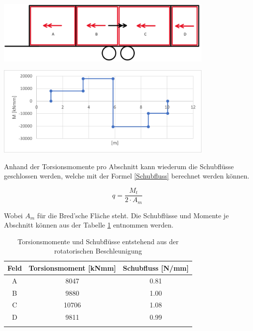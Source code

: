 \begin{center}
  \includegraphics[width=0.8\textwidth]{04_Figures/1.5 Momente.png}
  \label{1.5 Momente}
\end{center}

\begin{center}
  \includegraphics[width=0.8\textwidth]{04_Figures/1.5 Momentenverlauf.png}
  \label{1.5 Momentenverlauf}
\end{center}

Anhand der Torsionsmomente pro Abschnitt kann wiederum die Schubflüsse geschlossen werden, welche mit der Formel \ref{Schubfluss} berechnet werden können.

\begin{equation}
  q = \frac{M_t}{2 \cdot A_m}
  \label{Schubfluss}
\end{equation}

Wobei $A_m$ für die Bred'sche Fläche steht.
Die Schubflüsse und Momente je Abschnitt können aus der Tabelle \ref{Schubfluss resultat} entnommen werden.

\begin{table}[h!]
  \centering
  \begin{tabular}{ccc}
    \thickhline
    Feld & Torsionsmoment [kNmm] & Schubfluss [N/mm] \\ \hline
    A    & 8047                  & 0.81\\
    B    & 9880                  & 1.00\\
    C    & 10706                 & 1.08\\
    D    & 9811                  & 0.99\\
    \thickhline
  \end{tabular}
\caption{Torsionsmomente und Schubflüsse entstehend aus der rotatorischen Beschleunigung}%
\label{Schubfluss resultat}
\end{table}

